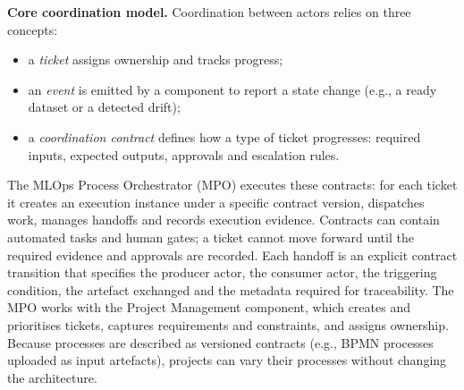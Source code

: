 \documentclass[11pt,a4paper]{article}
\begin{document}
\textbf{Core coordination model.}
Coordination between actors relies on three concepts:
\begin{itemize}
  \item a \emph{ticket} assigns ownership and tracks progress;
  \item an \emph{event} is emitted by a component to report a state change (e.g., a ready dataset or a detected drift);
  \item a \emph{coordination contract} defines how a type of ticket progresses: required inputs, expected outputs, approvals and escalation rules.
\end{itemize}
The MLOps Process Orchestrator (MPO) executes these contracts: for each ticket it creates an execution instance under a specific contract version, dispatches work, manages handoffs and records execution evidence. Contracts can contain automated tasks and human gates; a ticket cannot move forward until the required evidence and approvals are recorded. Each handoff is an explicit contract transition that specifies the producer actor, the consumer actor, the triggering condition, the artefact exchanged and the metadata required for traceability. The MPO works with the Project Management component, which creates and prioritises tickets, captures requirements and constraints, and assigns ownership. Because processes are described as versioned contracts (e.g., BPMN processes uploaded as input artefacts), projects can vary their processes without changing the architecture.
\end{document}
